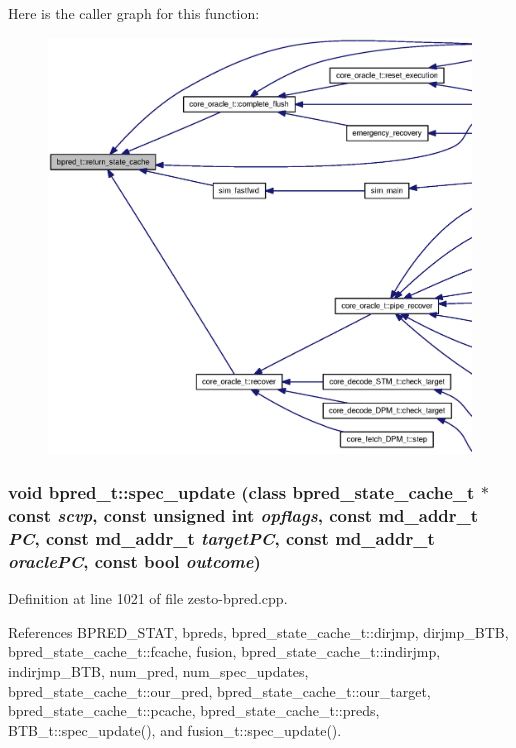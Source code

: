 Here is the caller graph for this function:\nopagebreak
\begin{figure}[H]
\begin{center}
\leavevmode
\includegraphics[width=420pt]{classbpred__t_f9c3b3c249ede7672c20b900ff8768e9_icgraph}
\end{center}
\end{figure}
\subsubsection[{spec\_\-update}]{\setlength{\rightskip}{0pt plus 5cm}void bpred\_\-t::spec\_\-update (class {\bf bpred\_\-state\_\-cache\_\-t} $\ast$const  {\em scvp}, \/  const unsigned int {\em opflags}, \/  const {\bf md\_\-addr\_\-t} {\em PC}, \/  const {\bf md\_\-addr\_\-t} {\em targetPC}, \/  const {\bf md\_\-addr\_\-t} {\em oraclePC}, \/  const bool {\em outcome})}\label{classbpred__t_90e48993937d7ed40623003e6d76b138}




Definition at line 1021 of file zesto-bpred.cpp.

References BPRED\_\-STAT, bpreds, bpred\_\-state\_\-cache\_\-t::dirjmp, dirjmp\_\-BTB, bpred\_\-state\_\-cache\_\-t::fcache, fusion, bpred\_\-state\_\-cache\_\-t::indirjmp, indirjmp\_\-BTB, num\_\-pred, num\_\-spec\_\-updates, bpred\_\-state\_\-cache\_\-t::our\_\-pred, bpred\_\-state\_\-cache\_\-t::our\_\-target, bpred\_\-state\_\-cache\_\-t::pcache, bpred\_\-state\_\-cache\_\-t::preds, BTB\_\-t::spec\_\-update(), and fusion\_\-t::spec\_\-update().


